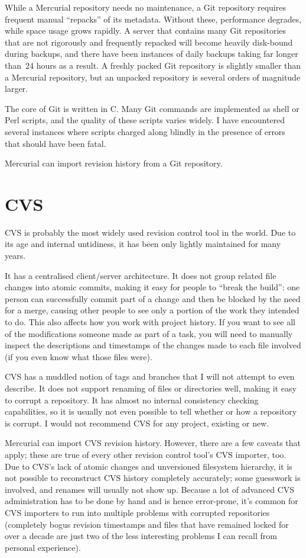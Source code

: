While a Mercurial repository needs no maintenance, a Git repository
requires frequent manual ``repacks'' of its metadata.  Without these,
performance degrades, while space usage grows rapidly.  A server that
contains many Git repositories that are not rigorously and frequently
repacked will become heavily disk-bound during backups, and there have
been instances of daily backups taking far longer than~24 hours as a
result.  A freshly packed Git repository is slightly smaller than a
Mercurial repository, but an unpacked repository is several orders of
magnitude larger.

The core of Git is written in C.  Many Git commands are implemented as
shell or Perl scripts, and the quality of these scripts varies widely.
I have encountered several instances where scripts charged along
blindly in the presence of errors that should have been fatal.

Mercurial can import revision history from a Git repository.


\section{CVS}

CVS is probably the most widely used revision control tool in the
world.  Due to its age and internal untidiness, it has been only
lightly maintained for many years.

It has a centralised client/server architecture.  It does not group
related file changes into atomic commits, making it easy for people to
``break the build'': one person can successfully commit part of a
change and then be blocked by the need for a merge, causing other
people to see only a portion of the work they intended to do.  This
also affects how you work with project history.  If you want to see
all of the modifications someone made as part of a task, you will need
to manually inspect the descriptions and timestamps of the changes
made to each file involved (if you even know what those files were).

CVS has a muddled notion of tags and branches that I will not attempt
to even describe.  It does not support renaming of files or
directories well, making it easy to corrupt a repository.  It has
almost no internal consistency checking capabilities, so it is usually
not even possible to tell whether or how a repository is corrupt.  I
would not recommend CVS for any project, existing or new.

Mercurial can import CVS revision history.  However, there are a few
caveats that apply; these are true of every other revision control
tool's CVS importer, too.  Due to CVS's lack of atomic changes and
unversioned filesystem hierarchy, it is not possible to reconstruct
CVS history completely accurately; some guesswork is involved, and
renames will usually not show up.  Because a lot of advanced CVS
administration has to be done by hand and is hence error-prone, it's
common for CVS importers to run into multiple problems with corrupted
repositories (completely bogus revision timestamps and files that have
remained locked for over a decade are just two of the less interesting
problems I can recall from personal experience).

